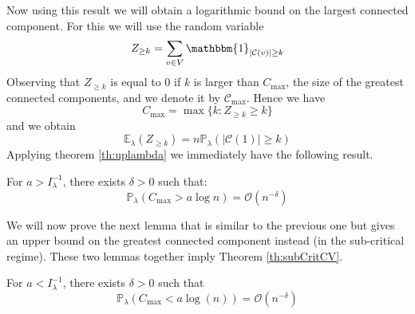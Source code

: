 Now using this result we will obtain a logarithmic bound on the largest connected component.
\newline
For this we will use the random variable 
\begin{equation}
	Z_{\geq k } = \sum_{v \in V} \mathbbm{1}_{|\mathcal{C}(v)| \geq k}
\end{equation}
Observing that $Z_{\geq k}$ is equal to 0 if $k$ is larger than $C_{\max}$, the size of the greatest connected components, and we denote it by $\mathcal{C}_{\max}$. Hence we have
\begin{equation}
	C_{\max} = \max\{k: Z_{\geq k} \geq k\}
\end{equation}
and we obtain 
\begin{equation}\label{eq:nexplambda}
	\mathbb{E}_{\lambda}(Z_{\geq k}) = n \mathbb{P}_{\lambda}(|\mathcal{C}(1)| \geq k)
\end{equation}
Applying theorem \ref{th:uplambda} we immediately have the following result.
\begin{lemma}\label{lemmalambdainf}
	For $a>I_{\lambda}^{-1}$, there exists $\delta > 0$ such that:
	\begin{equation}
		\mathbb{P}_{\lambda}(C_{\max} > a \log n) = \mathcal{O}(n^{-\delta}) 
	\end{equation}
\end{lemma}
We will now prove the next lemma that is similar to the previous one but gives an upper bound on the greatest connected component instead (in the sub-critical regime).
These two lemmas together imply Theorem \ref{th:subCritCV}.
\begin{lemma}\label{lemmalambdasup}
	For $a<I_{\lambda}^{-1}$, there exists $\delta >0$ such that
	\begin{equation}
		\mathbb{P}_{\lambda}(C_{\max} < a\log(n)) = \mathcal{O}(n^{-\delta})
	\end{equation}
\end{lemma}
